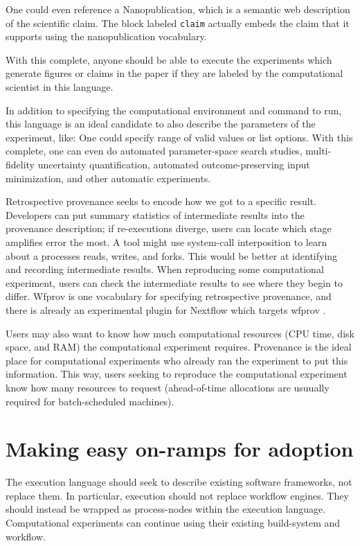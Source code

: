 \documentclass[manuscript,authordraft]{acmart}
\begin{document}
One could even reference a Nanopublication, which is a semantic web
description of the scientific claim. The block labeled \texttt{claim}
actually embeds the claim that it supports using the nanopublication
vocabulary.

With this complete, anyone should be able to execute the experiments
which generate figures or claims in the paper if they are labeled by the
computational scientist in this language.

In addition to specifying the computational environment and command to
run, this language is an ideal candidate to also describe the parameters
of the experiment, like: One could specify range of valid values or list
options. With this complete, one can even do automated parameter-space
search studies, multi-fidelity uncertainty quantification, automated
outcome-preserving input minimization, and other automatic experiments.

Retrospective provenance seeks to encode how we got to a specific
result. Developers can put summary statistics of intermediate results
into the provenance description; if re-executions diverge, users can
locate which stage amplifies error the most. A tool might use
system-call interposition to learn about a processes reads, writes, and
forks. This would be better at identifying and recording intermediate
results. When reproducing some computational experiment, users can check
the intermediate results to see where they begin to differ. Wfprov is
one vocabulary for specifying retrospective provenance, and there is
already an experimental plugin for Nextflow which targets wfprov
\cite{grande_nf-prov_2023}.

Users may also want to know how much computational resources (CPU time,
disk space, and RAM) the computational experiment requires. Provenance
is the ideal place for computational experiments who already ran the
experiment to put this information. This way, users seeking to reproduce
the computational experiment know how many resources to request
(ahead-of-time allocations are usuually required for batch-scheduled
machines).

\hypertarget{making-easy-on-ramps-for-adoption}{%
\section{Making easy on-ramps for
adoption}\label{making-easy-on-ramps-for-adoption}}

The execution language should seek to describe existing software
frameworks, not replace them. In particular, execution should not
replace workflow engines. They should instead be wrapped as
process-nodes within the execution language. Computational experiments
can continue using their existing build-system and workflow.
\end{document}
